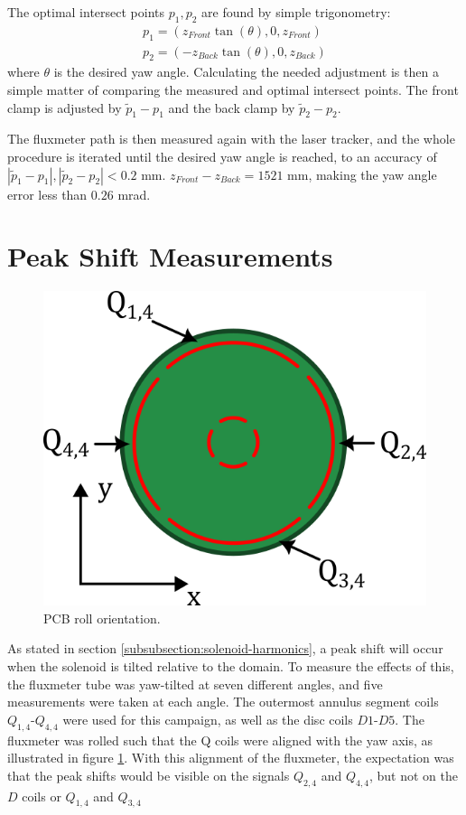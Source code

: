 The optimal intersect points $p_1, p_2$
are found by simple trigonometry:
\begin{align}
    p_1 = (z_{Front}\tan(\theta), 0, z_{Front}) \\
    p_2 = (-z_{Back}\tan(\theta), 0, z_{Back})
\end{align}
where $\theta$ is the desired yaw angle. Calculating the needed
adjustment is then a simple matter of comparing the measured
and optimal intersect points. The front clamp is adjusted by
$\tilde{p}_1 - p_1$ and the back clamp by $\tilde{p}_2 - p_2$.

The fluxmeter path is then measured again with the laser tracker,
and the whole procedure is iterated until the desired yaw angle
is reached, to an accuracy of
$|\tilde{p}_1 - p_1|, |\tilde{p}_2 - p_2| < 0.2$ mm.
$z_{Front} - z_{Back} = 1521$ mm, making the yaw angle error
less than $0.26$ mrad.

\section{Peak Shift Measurements}

\begin{figure}
    \centering
    \includegraphics[width=0.8\linewidth]{figs/pcborientation}
    \caption{PCB roll orientation.}
    \label{fig:pcbalignment}
\end{figure}

As stated in section \ref{subsubsection:solenoid-harmonics},
a peak shift will occur when the solenoid is tilted relative
to the domain. To measure the effects of this, the fluxmeter
tube was yaw-tilted at seven different angles, and five
measurements were taken at each angle. The outermost
annulus segment coils $Q_{1,4}$-$Q_{4,4}$ were used for this campaign,
as well as the disc coils $D1$-$D5$. The fluxmeter was rolled
such that the Q coils were aligned with the yaw axis, as illustrated
in figure \ref{fig:pcbalignment}. With this alignment of the fluxmeter,
the expectation was that the peak shifts would be visible on the
signals $Q_{2,4}$ and $Q_{4,4}$, but not on the $D$ coils or
$Q_{1,4}$ and $Q_{3,4}$

